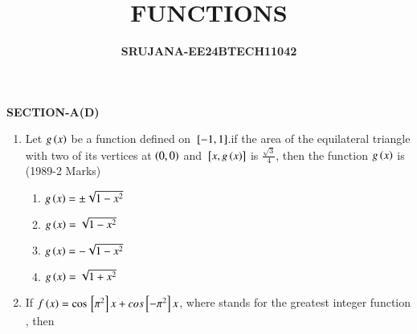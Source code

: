 \documentclass[journal,12pt,twocolumn]{IEEEtran}
\theoremstyle{remark}
\begin{document}

\vspace{3cm}

\title{\textbf{FUNCTIONS}}
\author{\textbf{SRUJANA-EE24BTECH11042}}


\maketitle
\newpage
\bigskip

\renewcommand{\thefigure}{\theenumi}
\renewcommand{\thetable}{\theenmui}
\begin{large}
	\textbf{SECTION-A(D)}
\end{large}
\begin{enumerate}[start=2]
\item Let $g\left(x\right)$ be a function defined on ${}\left[-1,1\right]$.if the area of the equilateral triangle with two of its vertices at $\left(0,0\right)$ and ${}\left[x,g\left(x\right)\right]$ is $\frac{\sqrt{3}}{4}$, then the function $g\left(x\right)$ is
\hfill(1989-2 Marks)
\begin{multicols}{2}
\begin{enumerate} 
\item $g\left(x\right)=\pm\sqrt{1-x^2}$ 
\item $g\left(x\right)=\sqrt{1-x^2}$
\item $g\left(x\right)=-\sqrt{1-x^2}$
\item $g\left(x\right)=\sqrt{1+x^2}$
\end{enumerate}
\end{multicols}
\item If $f\left(x\right) = \cos{}\left[\pi^2\right]x + cos{}\left[-\pi^2\right]x$, where
 stands for the greatest integer function , then  


\end{enumerate}
\end{document}
